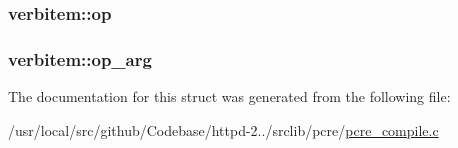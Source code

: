 \subsubsection[{\texorpdfstring{op}{op}}]{ verbitem\+::op}\hypertarget{structverbitem_a15cb4ddbd5304975ec67a2e50415e5d9}{}\label{structverbitem_a15cb4ddbd5304975ec67a2e50415e5d9}
\subsubsection[{\texorpdfstring{op\+\_\+arg}{op_arg}}]{ verbitem\+::op\+\_\+arg}\hypertarget{structverbitem_ad1956196d39f60ecae091dc6c4747a69}{}\label{structverbitem_ad1956196d39f60ecae091dc6c4747a69}


The documentation for this struct was generated from the following file\+:\begin{DoxyCompactItemize}
\item 
/usr/local/src/github/\+Codebase/httpd-\/2../srclib/pcre/\hyperlink{pcre__compile_8c}{pcre\+\_\+compile.\+c}\end{DoxyCompactItemize}
